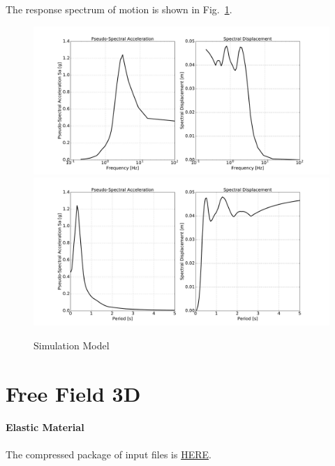 The response spectrum of motion is shown in Fig.~\ref{fig_spectrum_freq_period_time_series}.
\begin{figure}[H]
  \centering
  \includegraphics[width = 15cm]{./Figure-files/nonlinear_analysis_steps/free_field_1D/DRM1D_motion_node_5_x_spectrum_freq.pdf}
  \includegraphics[width = 15cm]{./Figure-files/nonlinear_analysis_steps/free_field_1D/DRM1D_motion_node_5_x_spectrum_period.pdf}
  \caption{Simulation Model}
  \label{fig_spectrum_freq_period_time_series}
\end{figure}

\clearpage
\newpage
\section{Free Field 3D}
\label{free_field_3D}

\paragraph{Elastic Material}
The compressed package of input files is  
\href{https://github.com/yuan-energy/Real-ESSI-Short-Course-Examples/tree/master/short-course-examples/nonlinear_analysis_steps/free_field_3D/elastic/elastic.tgz?raw=true}{HERE}. 


